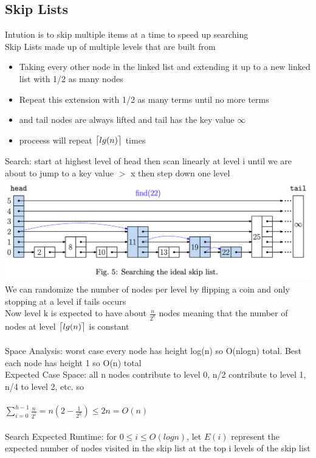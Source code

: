 \documentclass{article}
\DeclarePairedDelimiter{\ceil}{\lceil}{\rceil}
\begin{document}
  \subsection{Skip Lists}
  Intution is to skip multiple items at a time to speed up searching \\
  Skip Lists made up of multiple levels that are built from
  \begin{itemize}[noitemsep]
  \item Taking every other node in the linked list and extending it up to a new linked list with 1/2 as many nodes
  \item Repeat this extension with 1/2 as many terms until no more terms 
  \item and tail nodes are always lifted and tail has the key value $\infty$
  \item proceess will repeat $\ceil[\big]{lg(n)}$ times
  \end{itemize}
  Search: start at highest level of head then scan linearly at level i until we are about to jump to a key value $>$ x then step down one level\\
  \includegraphics[width=\textwidth]{SkipListSearch}
  We can randomize the number of nodes per level by flipping a coin and only stopping at a level if tails occurs\\
  Now level k is expected to have about $\frac{n}{2^{k}}$ nodes meaning that the number of nodes at level $\ceil[\big]{lg(n)}$ is constant\\ \\
  Space Analysis: worst case every node has height log(n) so O(nlogn) total. Best each node has height 1 so O(n) total\\
  Expected Case Space: all n nodes contribute to level 0, n/2 contribute to level 1, n/4 to level 2, etc. so\\ \\
  $\sum_{i=0}^{h-1}\frac{n}{2^{i}} = n(2 - \frac{1}{2^{h}}) \leq 2n = O(n)$\\ \\
  Search Expected Runtime: for $0 \leq i \leq O(logn)$, let $E(i)$ represent the expected number of nodes visited in the skip list at the top i levels of the skip list\\
\end{document}
